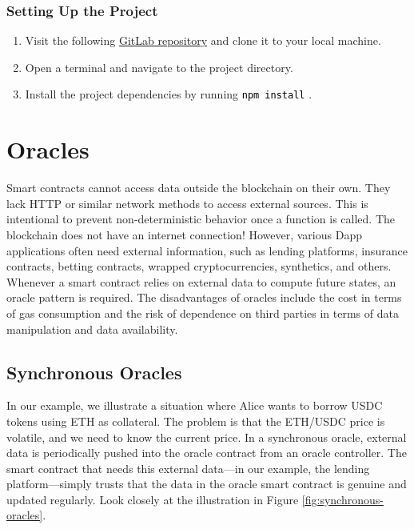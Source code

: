 \documentclass[12pt]{article}
\newcommand{\codegrey}[1]{%
  \texttt{\colorbox{black!4}{\textcolor{black}{#1}}}%
}
\begin{document}
\subsubsection*{Setting Up the Project}

\begin{enumerate}
    \item Visit the following \href{https://gitlab.fel.cvut.cz/radovluk/smart-contracts-exercises/-/tree/main/05-Re-Entrancy/task/task-code}{GitLab repository} and clone it to your local machine.
    \item Open a terminal and navigate to the project directory.
    \item Install the project dependencies by running \codegrey{npm install}.
\end{enumerate}

\section{Oracles}
Smart contracts cannot access data outside the blockchain on their own. They lack HTTP or similar network methods to access external sources. This is intentional to prevent non-deterministic behavior once a function is called. The blockchain does not have an internet connection! However, various Dapp applications often need external information, such as lending platforms, insurance contracts, betting contracts, wrapped cryptocurrencies, synthetics, and others. Whenever a smart contract relies on external data to compute future states, an oracle pattern is required. The disadvantages of oracles include the cost in terms of gas consumption and the risk of dependence on third parties in terms of data manipulation and data availability.

\subsection*{Synchronous Oracles}

In our example, we illustrate a situation where Alice wants to borrow USDC tokens using ETH as collateral. The problem is that the ETH/USDC price is volatile, and we need to know the current price. In a synchronous oracle, external data is periodically pushed into the oracle contract from an oracle controller. The smart contract that needs this external data—in our example, the lending platform—simply trusts that the data in the oracle smart contract is genuine and updated regularly. Look closely at the illustration in Figure \ref{fig:synchronous-oracles}. %
\end{document}
